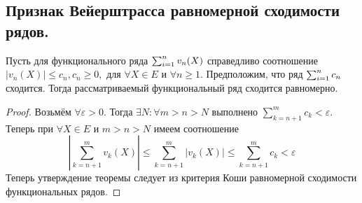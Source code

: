 \documentclass[main]{subfiles}
\begin{document}
\subsection{Признак Вейерштрасса равномерной сходимости рядов.}
\begin{theorem}
     Пусть для функционального ряда $\sum^n_{i=1} v_n(X) $ справедливо соотношение
      $|v_n(X)|\leq c_n, c_n\geq 0,$ для $\forall X\in E$ и $\forall n\geq 1.$ 
      Предположим, что ряд $\sum^n_{i=1} c_n$ сходится. Тогда рассматриваемый функциональный ряд сходится равномерно.\end{theorem}
\begin{proof} 
    Возьмём $\forall \varepsilon >0.$ Тогда $\exists N: \forall m>n>N$ выполнено $\sum_{k=n+1}^m c_k<\varepsilon$. 
    Теперь при $\forall X\in E$ и $m>n>N$ имеем соотношение 
    \[ |\sum_{k=n+1}^m v_k(X)|\leq \sum_{k=n+1}^m |v_k(X)|\leq \sum_{k=n+1}^m c_k<\varepsilon \]
Теперь утверждение теоремы следует из критерия Коши равномерной сходимости функциональных рядов. \end{proof}
\end{document}
